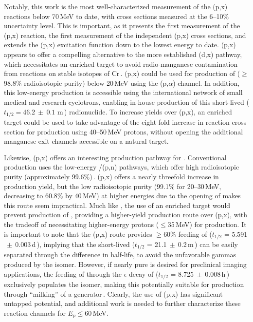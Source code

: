 Notably, this work is the most well-characterized measurement of the (p,x) reactions below 70\,MeV to date, with cross sections measured  at the 6--10\% uncertainty level.
This is important, as it presents the first measurement of the (p,x) reaction,  the first measurement of the independent (p,x) cross sections, and extends the (p,x) excitation function down to the lowest energy to date. 
(p,x) appears to offer a compelling alternative to the more established (d,x) pathway, which necessitates an enriched  target to avoid radio-manganese contamination from reactions on stable isotopes of Cr\,\cite{Klein2000}.
(p,x) could be used for 
production of   ($\geq$98.8\% radioisotopic purity) below 20\,MeV using the (p,$\alpha$) channel.
In addition, this low-energy production is accessible using the international network of small medical and research cyclotrons, enabling in-house production of this short-lived ($t_{1/2}=46.2~\pm~0.1$ m\,\cite{Wang2017}) radionuclide.
To increase yields over (p,x), an enriched  target could be used to take advantage of the eight-fold increase in reaction cross section for production using 40--50\,MeV protons, without opening the additional manganese exit channels accessible on a natural target.



Likewise, (p,x) offers an interesting production pathway for  .
Conventional production uses the low-energy /(p,n) pathways, which offer high radioisotopic purity (approximately 99.6\%)\,\cite{Graves2015,Wooten2015}.
(p,x) offers a nearly threefold increase in production yield, but the low radioisotopic purity (99.1\% for 20--30\,MeV, decreasing to 60.8\% by 40\,MeV) at higher energies due to the opening of  makes this route seem impractical.
Much like , the use of an enriched  target would prevent production of , providing a higher-yield production route over   (p,x), with the tradeoff of necessitating higher-energy protons ($\leq$35\,MeV) for production.
It is important to note that the (p,x) route provides $\geq$60\% feeding of  ($t_{1/2}$ = 5.591$~\pm~$0.003\,d\,\cite{Dong2015}), implying that the short-lived   ($t_{1/2}$ = 21.1$~\pm~$0.2\,m\,\cite{Dong2015}) can be easily separated through the difference in half-life, to avoid the unfavorable gammas produced by the isomer. 
However, if nearly pure  is desired for preclinical imaging applications, the feeding of  through the $\epsilon$ decay of  ($t_{1/2}$ = 8.725$~\pm~$0.008\,h\,\cite{Dong2015}) exclusively populates the isomer, making this potentially suitable for production through \enquote{milking} of a  generator\,\cite{Blauenstein1997}.
Clearly, the use of (p,x) has significant untapped potential, and additional work is needed to further characterize these reaction channels for $E_p \leq$60\,MeV.


